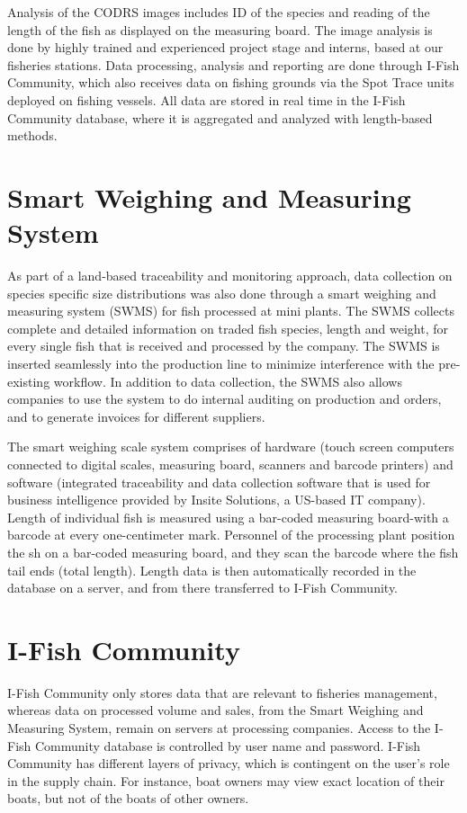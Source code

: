 Analysis of the CODRS images includes ID of the species and reading of the length of the fish as displayed on the measuring board. The image analysis is done by highly trained and experienced project stage and interns, based at our fisheries stations. Data processing, analysis and reporting are done through I-Fish Community, which also receives data on fishing grounds via the Spot Trace units deployed on fishing vessels. All data are stored in real time in the I-Fish Community database, where it is aggregated and analyzed with length-based methods.

\clearpage
\newpage

\section{Smart Weighing and Measuring System}

As part of a land-based traceability and monitoring approach, data collection on species specific size distributions was also done through a smart weighing and measuring system (SWMS) for fish processed at mini plants. The SWMS collects complete and detailed information on traded fish species, length and weight, for every single fish that is received and processed by the company. The SWMS is inserted seamlessly into the production line to minimize interference with the pre-existing workflow. In addition to data collection, the SWMS also allows companies to use the system to do internal auditing on production and orders, and to generate invoices for different suppliers.

The smart weighing scale system comprises of hardware (touch screen computers connected to digital scales, measuring board, scanners and barcode printers) and software (integrated traceability and data collection software that is used for business intelligence provided by Insite Solutions, a US-based IT company). Length of individual fish is measured using a bar-coded measuring board-with a barcode at every one-centimeter mark. Personnel of the processing plant position the  sh on a bar-coded measuring board, and they scan the barcode where the fish tail ends (total length). Length data is then automatically recorded in the database on a server, and from there transferred to I-Fish Community.


\section{I-Fish Community}

I-Fish Community only stores data that are relevant to fisheries management, whereas data on processed volume and sales, from the Smart Weighing and Measuring System, remain on servers at processing companies. Access to the I-Fish Community database is controlled by user name and password. I-Fish Community has different layers of privacy, which is contingent on the user's role in the supply chain. For instance, boat owners may view exact location of their boats, but not of the boats of other owners.

